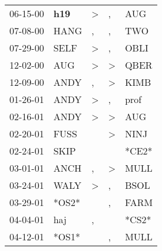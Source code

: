 \begin{supertabular}{p{0.07\textwidth}p{0.06\textwidth}p{0.02\textwidth}p{0.02\textwidth}p{0.06\textwidth}}
          06-15-00\textsuperscript{} &   \textbf{h19\textsuperscript{}} &     \textgreater &                , &            AUG\textsuperscript{} \\
          07-08-00\textsuperscript{} &           HANG\textsuperscript{} &                , &                , &            TWO\textsuperscript{} \\
          07-29-00\textsuperscript{} &           SELF\textsuperscript{} &     \textgreater &                , &           OBLI\textsuperscript{} \\
          12-02-00\textsuperscript{} &            AUG\textsuperscript{} &     \textgreater &     \textgreater &           QBER\textsuperscript{} \\
          12-09-00\textsuperscript{} &           ANDY\textsuperscript{} &                , &     \textgreater &           KIMB\textsuperscript{} \\
          01-26-01\textsuperscript{} &           ANDY\textsuperscript{} &     \textgreater &                , &           prof\textsuperscript{} \\
          02-16-01\textsuperscript{} &           ANDY\textsuperscript{} &     \textgreater &     \textgreater &            AUG\textsuperscript{} \\
          02-20-01\textsuperscript{} &           FUSS\textsuperscript{} &                  &     \textgreater &           NINJ\textsuperscript{} \\
          02-24-01\textsuperscript{} &           SKIP\textsuperscript{} &                  &                  &                            *CE2* \\
          03-01-01\textsuperscript{} &           ANCH\textsuperscript{} &                , &     \textgreater &           MULL\textsuperscript{} \\
          03-24-01\textsuperscript{} &           WALY\textsuperscript{} &     \textgreater &                , &           BSOL\textsuperscript{} \\
          03-29-01\textsuperscript{} &                            *OS2* &                  &                , &           FARM\textsuperscript{} \\
          04-04-01\textsuperscript{} &            haj\textsuperscript{} &                , &                  &                            *CS2* \\
          04-12-01\textsuperscript{} &                            *OS1* &                  &                , &           MULL\textsuperscript{} \\

\end{supertabular}
